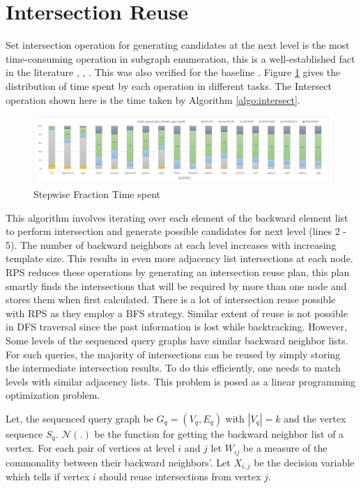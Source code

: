 {\section{Intersection Reuse}\label{sec:reuse-impl}
Set intersection operation for generating candidates at the next level is the most time-consuming operation in subgraph enumeration, this is a well-established fact in the literature \cite{RPS-paper}, \cite{LIGHT}, \cite{VF3}.
This was also verified for the baseline \cite{PARSEC_VD}. Figure \ref{fig:time-dist} gives the distribution of time spent by each operation in different tasks. The Intersect operation shown here is the time taken by Algorithm \ref{algo:intersect}.
\begin{figure}
    \includegraphics[width=\textwidth]{fig/improvements/time-distributions-yt.png}
    \caption{Stepwise Fraction Time spent}
    \label{fig:time-dist}
\end{figure}
This algorithm involves iterating over each element of the backward element list to perform intersection and generate possible candidates for next level (lines 2 - 5).
The number of backward neighbors at each level increases with increasing template size. This results in even more adjacency list intersections at each node.
RPS \cite{RPS-paper} reduces these operations by generating an intersection reuse plan, this plan smartly finds the intersections that will be required by more than one node and stores them when first calculated. There is a lot of intersection reuse possible with RPS as they employ a BFS strategy.
Similar extent of reuse is not possible in DFS traversal since the past information is lost while backtracking.
However, Some levels of the sequenced query graphs have similar backward neighbor lists. For such queries, the majority of intersections can be reused by simply storing the intermediate intersection results.
To do this efficiently, one needs to match levels with similar adjacency lists. This problem is posed as a linear programming optimization problem.

Let, the sequenced query graph be $G_q=(V_q, E_q)$ with $|V_q|=k$ and the vertex sequence $S_q$.
$\mathcal{N}(.)$ be the function for getting the backward neighbor list of a vertex.
For each pair of vertices at level $i$ and $j$ let $W_{ij}$ be a measure of the commonality between their backward neighbors'. Let $X_{i,j}$ be the decision variable which tells if vertex $i$ should reuse intersections from vertex $j$.

}
